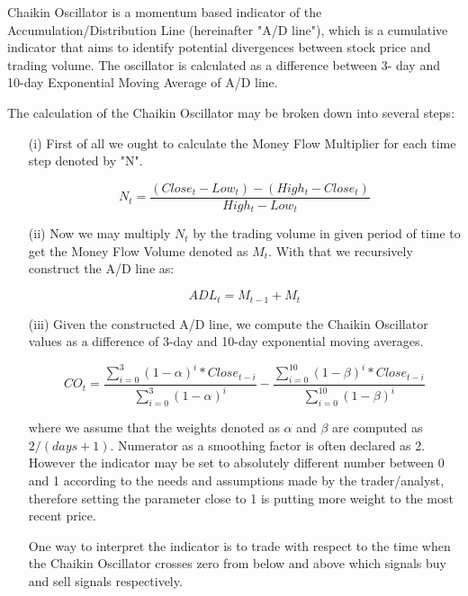 Chaikin Oscillator is a momentum based indicator of the Accumulation/Distribution Line (hereinafter "A/D line"), which is a cumulative indicator that aims to identify potential divergences between stock price and trading volume. The oscillator is calculated as a difference between 3- day and 10-day Exponential Moving Average of A/D line. 

\vspace{0.5cm}

The calculation of the Chaikin Oscillator may be broken down into several steps:
\begin{itemize}
\item[(i)] First of all we ought to calculate the Money Flow Multiplier for each time step denoted by "N".

\begin{equation}
N_{t} = \frac{(Close_{t} - Low_{t}) - (High_{t} - Close_{t})}{High_{t} - Low_{t}}
\end{equation}

\item[(ii)] Now we may multiply $N_t$ by the trading volume in given period of time to get the Money Flow Volume denoted as $M_t$. With that we recursively construct the A/D line as:

\begin{equation}
ADL_t = M_{t-1} + M_t
\end{equation}

\item[(iii)] Given the constructed A/D line, we compute the Chaikin Oscillator values as a difference of 3-day and 10-day exponential moving averages.

\begin{equation}
CO_t = \frac{\sum_{i=0}^{3} (1-\alpha)^i*Close_{t-i}}{\sum_{i=0}^{3} (1-\alpha)^i} - \frac{\sum_{i=0}^{10} (1-\beta)^i*Close_{t-i}}{\sum_{i=0}^{10} (1-\beta)^i}
\end{equation}

where we assume that the weights denoted as $\alpha$ and $\beta$ are computed as $2/(days + 1)$. Numerator as a smoothing factor is often declared as 2. However the indicator may be set to absolutely different number between 0 and 1 according to the needs and assumptions made by the trader/analyst, therefore setting the parameter close to 1 is putting more weight to the most recent price.

One way to interpret the indicator is to trade with respect to the time when the Chaikin Oscillator crosses zero from below and above which signals buy and sell signals respectively.

\end{itemize}


